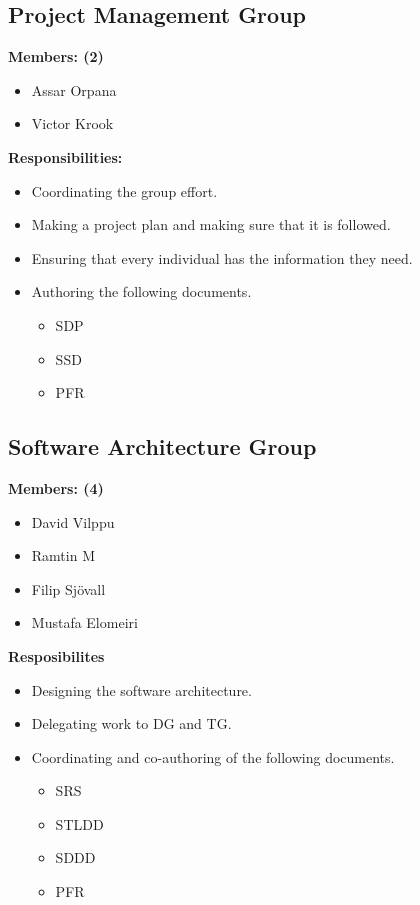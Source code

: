 \documentclass{article}
\begin{document}
    \subsection{Project Management Group}
        \textbf{Members: (2)}
        \begin{itemize}
            \item Assar Orpana
            \item Victor Krook
        \end{itemize}
        \textbf{Responsibilities:}
        \begin{itemize}
            \item Coordinating the group effort.
            \item Making a project plan and making sure that it is followed.
            \item Ensuring that every individual has the information they need.
            \item Authoring the following documents.
                \begin{itemize}
                    \item SDP
                    \item SSD
                    \item PFR
                \end{itemize} 
        \end{itemize}
        
    \subsection{Software Architecture Group}
        \textbf{Members: (4)}
        \begin{itemize}
            \item David Vilppu
            \item Ramtin M
            \item Filip Sjövall
            \item Mustafa Elomeiri
        \end{itemize}
        \textbf{Resposibilites}
        \begin{itemize}
            \item Designing the software architecture.
            \item Delegating work to DG and TG.
            \item Coordinating and co-authoring of the following documents.
                \begin{itemize}
                    \item SRS
                    \item STLDD
                    \item SDDD
                    \item PFR
                \end{itemize} 
        \end{itemize}
 
\end{document}
